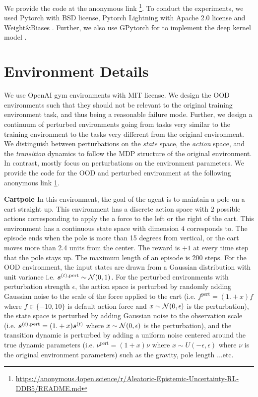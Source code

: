 We provide the code at the anonymous link \footnote{\label{link:code}\url{https://anonymous.4open.science/r/Aleatoric-Epistemic-Uncertainty-RL-DDB5/README.md}}. To conduct the experiments, we used Pytorch \cite{pytorch} with BSD license, Pytorch Lightning \citep{pytorch-lightning} with Apache 2.0 license and Weight\&Biases \cite{wandb}. Further, we also use GPytorch for to implement the deep kernel model \cite{gpytorch}.

\section{Environment Details}
\label{app:environments-details}

We use OpenAI gym environments \cite{gym} with MIT license. We design the OOD environments such that they should not be relevant to the original training environment task, and thus being a reasonable failure mode. Further, we design a continuum of perturbed environments going from tasks very similar to the training environment to the tasks very different from the original environment. We distinguish between perturbations on the \emph{state} space, the \emph{action} space, and the \emph{transition} dynamics to follow the MDP structure of the original environment. In contrast, \cite{assessing-generalization-rl, benchmark-ood-detection-rl} mostly focus on perturbations on the environment parameters. We provide the code for the OOD and perturbed environment at the following anonymous link \ref{link:code}.

\textbf{Cartpole \citep{cartpole}} In this environment, the goal of the agent is to maintain a pole on a cart straight up. This environment has a discrete action space with $2$ possible actions corresponding to apply the a force to the left or the right of the cart. This environment has a continuous state space with dimension $4$ corresponds to. The episode ends when the pole is more than 15 degrees from vertical, or the cart moves more than 2.4 units from the center. The reward is $+1$ at every time step that the pole stays up. The maximum length of an episode is 200 steps. For the OOD environment, the input states are drawn from a Gaussian distribution with unit variance i.e. $\bm{s}^{(t), \text{pert}} \sim \operatorname{\mathcal{N}}(0, 1)$. For the perturbed environments with perturbation strength $\epsilon$, the action space is perturbed by randomly adding Gaussian noise to the scale of the force applied to the cart (i.e. $f^{\text{pert}} = (1. + x)f$ where $f \in \{-10, 10\}$ is default action force and $x \sim \operatorname{\mathcal{N}}(0, \epsilon)$ is the perturbation), the state space is perturbed by adding Gaussian noise to the observation scale (i.e. $\bm{s}^{(t), \text{pert}} = (1. + x)\bm{s}^{(t)}$ where $x \sim \operatorname{\mathcal{N}}(0, \epsilon)$ is the perturbation), and the transition dynamic is perturbed by adding a uniform noise centered around the true dynamic parameters (i.e. $\nu^{\text{pert}} = (1 + x) \nu$ where $x \sim U(-\epsilon, \epsilon)$ where $\nu$ is the original environment parameters) such as the gravity, pole length ...etc.

